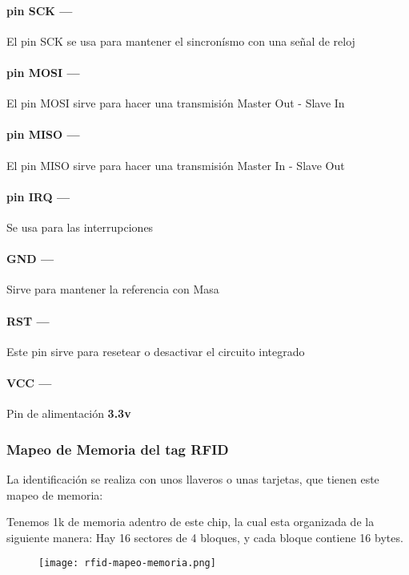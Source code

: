 \documentclass[../informe_krapp.tex]{subfiles}
\begin{document}
\paragraph{pin SCK ---}
El pin SCK se usa para mantener el sincronísmo con una señal de reloj

\paragraph{pin MOSI ---}
El pin MOSI sirve para hacer una transmisión Master Out - Slave In

\paragraph{pin MISO ---}
El pin MISO sirve para hacer una transmisión Master In - Slave Out

\paragraph{pin IRQ ---}
Se usa para las interrupciones

\paragraph{GND ---}
Sirve para mantener la referencia con Masa

\paragraph{RST ---}
Este pin sirve para resetear o desactivar el circuito integrado

\paragraph{VCC ---}
Pin de alimentación \textbf{3.3v}

\clearpage
\subsubsection{Mapeo de Memoria del tag RFID}
La identificación se realiza con unos llaveros o unas tarjetas,
que tienen este mapeo de memoria:

Tenemos 1k de memoria adentro de este chip, la cual esta organizada de la
siguiente manera: Hay 16 sectores de 4 bloques, y cada bloque contiene 16 bytes.

\begin{figure}[H]
	\centering
	\texttt{[image: rfid-mapeo-memoria.png]}
\end{figure}
\end{document}
